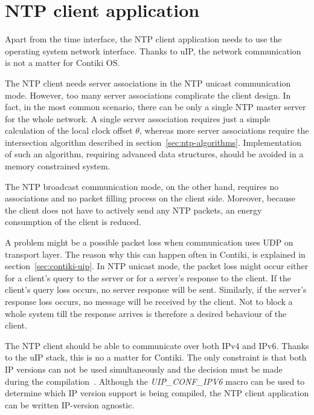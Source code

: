 






\section{NTP client application}
Apart from the time interface, the NTP client application needs to use the operating system network interface.
Thanks to uIP, the network communication is not a matter for Contiki OS.

The NTP client needs server associations in the NTP unicast communication mode.
However, too many server associations complicate the client design.
In fact, in the most common scenario, there can be only a single NTP master server
for the whole network.
A single server association requires just a simple calculation of the local clock offset
$\theta$, whereas more server associations require the intersection algorithm
described in section~\ref{sec:ntp-algorithms}.
Implementation of such an algorithm, requiring advanced data structures, should be avoided
in a memory constrained system.

The NTP broadcast communication mode, on the other hand,
requires no associations and no packet filling process on the client side.
Moreover, because the client does not have to actively send any NTP packets,
an energy consumption of the client is reduced.

A problem might be a possible packet loss when communication uses UDP on transport layer.
The reason why this can happen often in Contiki, is explained in section~\ref{sec:contiki-uip}.
In NTP unicast mode, the packet loss might occur either for a client's query to the server
or for a server's response to the client.
If the client's query loss occurs, no server response will be sent.
Similarly, if the server's response loss occurs, no message will be received by the client.
Not to block a whole system till the response arrives
is therefore a desired behaviour of the client.

The NTP client should be able to communicate over both IPv4 and IPv6.
Thanks to the uIP stack, this is no a matter for Contiki.
The only constraint is that both IP versions can not be used simultaneously
and the decision must be made during the compilation~\cite{contiki-docs}.
Although the {\it{UIP\_CONF\_IPV6}} macro can be used to determine which IP version
support is being compiled, the NTP client application can be written IP-version agnostic.

